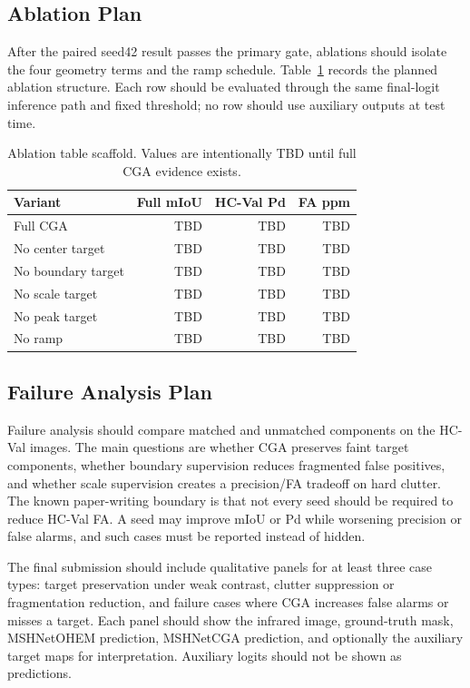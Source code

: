 \documentclass[letterpaper]{article}
\begin{document}
\subsection{Ablation Plan}

After the paired seed42 result passes the primary gate, ablations should isolate the four geometry terms and the ramp schedule. Table~\ref{tab:ablation-plan} records the planned ablation structure. Each row should be evaluated through the same final-logit inference path and fixed threshold; no row should use auxiliary outputs at test time.

\begin{table}[t]
\centering
\caption{Ablation table scaffold. Values are intentionally TBD until full CGA evidence exists.}
\label{tab:ablation-plan}
\small
\begin{tabular}{lrrr}
\toprule
Variant & Full mIoU & HC-Val Pd & FA ppm \\
\midrule
Full CGA & TBD & TBD & TBD \\
No center target & TBD & TBD & TBD \\
No boundary target & TBD & TBD & TBD \\
No scale target & TBD & TBD & TBD \\
No peak target & TBD & TBD & TBD \\
No ramp & TBD & TBD & TBD \\
\bottomrule
\end{tabular}
\end{table}

\subsection{Failure Analysis Plan}

Failure analysis should compare matched and unmatched components on the HC-Val images. The main questions are whether CGA preserves faint target components, whether boundary supervision reduces fragmented false positives, and whether scale supervision creates a precision/FA tradeoff on hard clutter. The known paper-writing boundary is that not every seed should be required to reduce HC-Val FA. A seed may improve mIoU or Pd while worsening precision or false alarms, and such cases must be reported instead of hidden.

The final submission should include qualitative panels for at least three case types: target preservation under weak contrast, clutter suppression or fragmentation reduction, and failure cases where CGA increases false alarms or misses a target. Each panel should show the infrared image, ground-truth mask, MSHNetOHEM prediction, MSHNetCGA prediction, and optionally the auxiliary target maps for interpretation. Auxiliary logits should not be shown as predictions.
\end{document}
